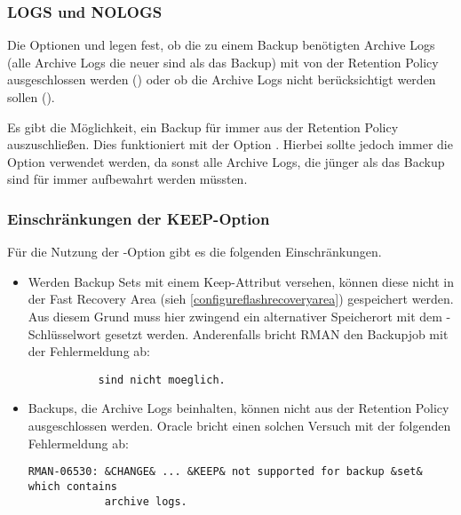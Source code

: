         \subsubsection{LOGS und NOLOGS}
          Die Optionen  und  legen fest, ob die zu einem Backup benötigten Archive Logs (alle Archive Logs die neuer sind als das Backup) mit von der Retention Policy ausgeschlossen werden () oder ob die Archive Logs nicht berücksichtigt werden sollen ().

          Es gibt die Möglichkeit, ein Backup für immer aus der Retention Policy auszuschließen. Dies funktioniert mit der Option . Hierbei sollte jedoch immer die Option  verwendet werden, da sonst alle Archive Logs, die jünger als das Backup sind für immer aufbewahrt werden müssten.
        \subsubsection{Einschränkungen der KEEP-Option}
          Für die Nutzung der -Option gibt es die folgenden Einschränkungen.
          \begin{itemize}
            \item Werden Backup Sets mit einem Keep-Attribut versehen, können diese nicht in der Fast Recovery Area (sieh \ref{configureflashrecoveryarea}) gespeichert werden. Aus diesem Grund muss hier zwingend ein alternativer Speicherort mit dem -Schlüsselwort gesetzt werden. Anderenfalls bricht RMAN den Backupjob mit der Fehlermeldung ab:
            \begin{lstlisting}[caption={Keine Dateien mit KEEP-Attribut in der FRA aufbewahren!},label=admin1031,language=terminal]
% ORA-19811: Dateien in DB_RECOVERY_FILE_DEST mit Keep-Attribut
           sind nicht moeglich.
            \end{lstlisting}
            \item Backups, die Archive Logs beinhalten, können nicht aus der Retention Policy ausgeschlossen werden. Oracle bricht einen solchen Versuch mit der folgenden Fehlermeldung ab:
            \begin{lstlisting}[caption={Backups mit Archive Logs dürfen kein KEEP-Attribut haben!},label=admin1032,language=terminal]
RMAN-06530: &CHANGE& ... &KEEP& not supported for backup &set& which contains
            archive logs.
            \end{lstlisting}
          \end{itemize}
